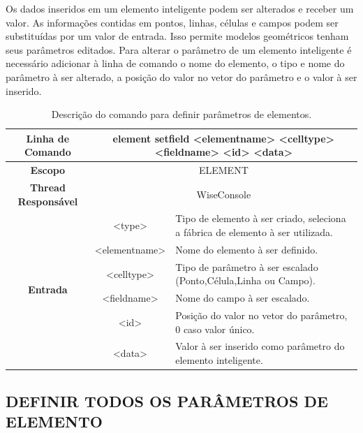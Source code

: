Os dados inseridos em um elemento inteligente podem ser alterados e receber um valor. As informações contidas em pontos, linhas, células e campos podem ser substituídas por um valor de entrada. Isso permite modelos geométricos tenham seus parâmetros editados. Para alterar o parâmetro de um elemento inteligente é necessário adicionar à linha de comando o nome do elemento, o tipo e nome do parâmetro à ser alterado, a posição do valor no vetor do parâmetro e o valor à ser inserido.

\begin{center}
	\begin{table}[!htbp]
		\begin{tabularx}{\textwidth}{c|c|X}
			\toprule
			\textbf{Linha de Comando} & \multicolumn{2}{c}{element set\underline{\space\space}field <element\underline{\space\space}name> <cell\underline{\space\space}type> <field\underline{\space\space}name> <id> <data>} \\
			\midrule
			\textbf{Escopo} & \multicolumn{2}{c}{ELEMENT} \\
			\hline
			\textbf{Thread Responsável} & \multicolumn{2}{c}{WiseConsole} \\
			\hline
			\multirow{6}{*}{\textbf{Entrada}} & <type> & Tipo de elemento à ser criado, seleciona a fábrica de elemento à ser utilizada. \\
			
			& <element\underline{\space\space}name> & Nome do elemento à ser definido. \\
			& <cell\underline{\space\space}type> & Tipo de parâmetro à ser escalado (Ponto,Célula,Linha ou Campo). \\
			& <field\underline{\space\space}name> & Nome do campo à ser escalado. \\
			& <id> & Posição do valor no vetor do parâmetro, 0 caso valor único. \\
			& <data> & Valor à ser inserido como parâmetro do elemento inteligente. \\
			\bottomrule
		\end{tabularx}
		\caption{Descrição do comando para definir parâmetros de elementos.}
		\label{tab:set_field_element}
	\end{table}
\end{center}

\subsection{DEFINIR TODOS OS PARÂMETROS DE ELEMENTO}\label{sec:set_all_field_element}

